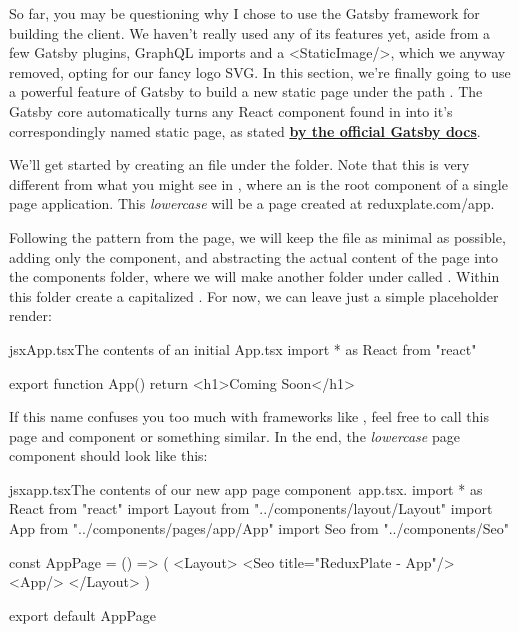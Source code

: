 \documentclass[paper=6in:9in,pagesize=pdftex,headinclude=on,footinclude=on,12pt,twoside]{scrbook}
\newcommand{\link}[2]{\textbf{\textcolor{monokaiPink}{\href{#2}{#1}}}}
\begin{document}

So far, you may be questioning why I chose to use the Gatsby framework for building the client. We haven't really used any of its features yet, aside from a few Gatsby plugins, GraphQL imports and a <StaticImage/>, which we anyway removed, opting for our fancy logo SVG. In this section, we're finally going to use a powerful feature of Gatsby to build a new static page under the path . The Gatsby core automatically turns any React component found in  into it's correspondingly named static page, as stated \link{by the official Gatsby docs}{https://www.gatsbyjs.com/docs/recipes/pages-layouts/}.


We'll get started by creating an  file under the  folder. Note that this is very different from what you might see in , where an  is the root component of a single page application. This \textit{lowercase}  will be a page created at reduxplate.com/app.

Following the pattern from the  page, we will keep the  file as minimal as possible, adding only the  component, and abstracting the actual content of the page into the components folder, where we will make another folder under  called . Within this folder create a capitalized . For now, we can leave just a simple placeholder render:

\begin{codeInput}{jsx}{App.tsx}{The contents of an initial App.tsx}
import * as React from "react"

export function App() {
  return <h1>Coming Soon</h1>
} 
\end{codeInput}

If this name  confuses you too much with frameworks like , feel free to call this page and component  or something similar. In the end, the \textit{lowercase} page component  should look like this:

\begin{codeInput}{jsx}{app.tsx}{The contents of our new app page component\, app.tsx.}
import * as React from "react"
import Layout from "../components/layout/Layout"
import { App } from "../components/pages/app/App"
import Seo from "../components/Seo"

const AppPage = () => (
  <Layout>
    <Seo title="ReduxPlate - App"/>
    <App/>
  </Layout>
)

export default AppPage  
\end{codeInput}
\end{document}
